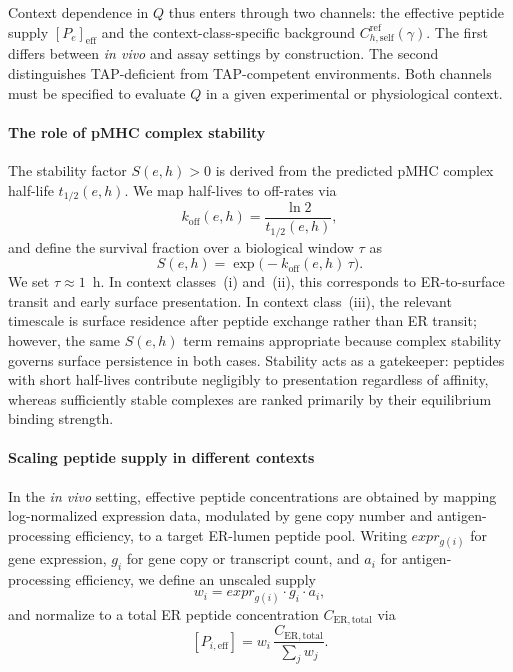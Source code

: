 \documentclass[11pt]{article}
\begin{document}
Context dependence in \(Q\) thus enters through two channels: the effective peptide supply \([P_e]_{\mathrm{eff}}\) and the context-class-specific background \(C^{\mathrm{ref}}_{h,\mathrm{self}}(\gamma)\). The first differs between \textit{in vivo} and assay settings by construction. The second distinguishes TAP-deficient from TAP-competent environments. Both channels must be specified to evaluate \(Q\) in a given experimental or physiological context.

\paragraph{The role of pMHC complex stability}
The stability factor \(S(e,h)>0\) is derived from the predicted pMHC complex half-life \(t_{1/2}(e,h)\). We map half-lives to off-rates via
\[
k_{\mathrm{off}}(e,h)=\frac{\ln 2}{t_{1/2}(e,h)},
\]
and define the survival fraction over a biological window \(\tau\) as
\[
S(e,h)=\exp\!\bigl(-k_{\mathrm{off}}(e,h)\,\tau\bigr).
\]
We set \(\tau\approx1\)~h. In context classes~(i) and~(ii), this corresponds to ER-to-surface transit and early surface presentation. In context class~(iii), the relevant timescale is surface residence after peptide exchange rather than ER transit; however, the same \(S(e,h)\) term remains appropriate because complex stability governs surface persistence in both cases. Stability acts as a gatekeeper: peptides with short half-lives contribute negligibly to presentation regardless of affinity, whereas sufficiently stable complexes are ranked primarily by their equilibrium binding strength.
\paragraph{Scaling peptide supply in different contexts}
In the \textit{in vivo} setting, effective peptide concentrations are obtained by mapping log-normalized expression data, modulated by gene copy number and antigen-processing efficiency, to a target ER-lumen peptide pool. Writing \(expr_{g(i)}\) for gene expression, \(g_i\) for gene copy or transcript count, and \(a_i\) for antigen-processing efficiency, we define an unscaled supply
\[
w_i = expr_{g(i)} \cdot g_i \cdot a_i,
\]
and normalize to a total ER peptide concentration \(C_{\mathrm{ER,total}}\) via
\[
[P_{i,\mathrm{eff}}]
=
w_i\,
\frac{C_{\mathrm{ER,total}}}{\sum_j w_j}.
\]
\end{document}
